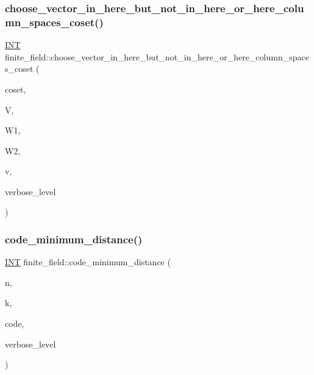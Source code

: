 \subsubsection{\texorpdfstring{choose\+\_\+vector\+\_\+in\+\_\+here\+\_\+but\+\_\+not\+\_\+in\+\_\+here\+\_\+or\+\_\+here\+\_\+column\+\_\+spaces\+\_\+coset()}{choose\_vector\_in\_here\_but\_not\_in\_here\_or\_here\_column\_spaces\_coset()}}
{\footnotesize\ttfamily \mbox{\hyperlink{galois_8h_a09fddde158a3a20bd2dcadb609de11dc}{I\+NT}} finite\+\_\+field\+::choose\+\_\+vector\+\_\+in\+\_\+here\+\_\+but\+\_\+not\+\_\+in\+\_\+here\+\_\+or\+\_\+here\+\_\+column\+\_\+spaces\+\_\+coset (\begin{DoxyParamCaption}\item[{\mbox{\hyperlink{galois_8h_a09fddde158a3a20bd2dcadb609de11dc}{I\+NT}} \&}]{coset,  }\item[{\mbox{\hyperlink{class_i_n_t__matrix}{I\+N\+T\+\_\+matrix}} $\ast$}]{V,  }\item[{\mbox{\hyperlink{class_i_n_t__matrix}{I\+N\+T\+\_\+matrix}} $\ast$}]{W1,  }\item[{\mbox{\hyperlink{class_i_n_t__matrix}{I\+N\+T\+\_\+matrix}} $\ast$}]{W2,  }\item[{\mbox{\hyperlink{galois_8h_a09fddde158a3a20bd2dcadb609de11dc}{I\+NT}} $\ast$}]{v,  }\item[{\mbox{\hyperlink{galois_8h_a09fddde158a3a20bd2dcadb609de11dc}{I\+NT}}}]{verbose\+\_\+level }\end{DoxyParamCaption})}

\mbox{\label{classfinite__field_aaa3eba052a2a1101e93bc180fb203e52}} 
\subsubsection{\texorpdfstring{code\+\_\+minimum\+\_\+distance()}{code\_minimum\_distance()}}
{\footnotesize\ttfamily \mbox{\hyperlink{galois_8h_a09fddde158a3a20bd2dcadb609de11dc}{I\+NT}} finite\+\_\+field\+::code\+\_\+minimum\+\_\+distance (\begin{DoxyParamCaption}\item[{\mbox{\hyperlink{galois_8h_a09fddde158a3a20bd2dcadb609de11dc}{I\+NT}}}]{n,  }\item[{\mbox{\hyperlink{galois_8h_a09fddde158a3a20bd2dcadb609de11dc}{I\+NT}}}]{k,  }\item[{\mbox{\hyperlink{galois_8h_a09fddde158a3a20bd2dcadb609de11dc}{I\+NT}} $\ast$}]{code,  }\item[{\mbox{\hyperlink{galois_8h_a09fddde158a3a20bd2dcadb609de11dc}{I\+NT}}}]{verbose\+\_\+level }\end{DoxyParamCaption})}

